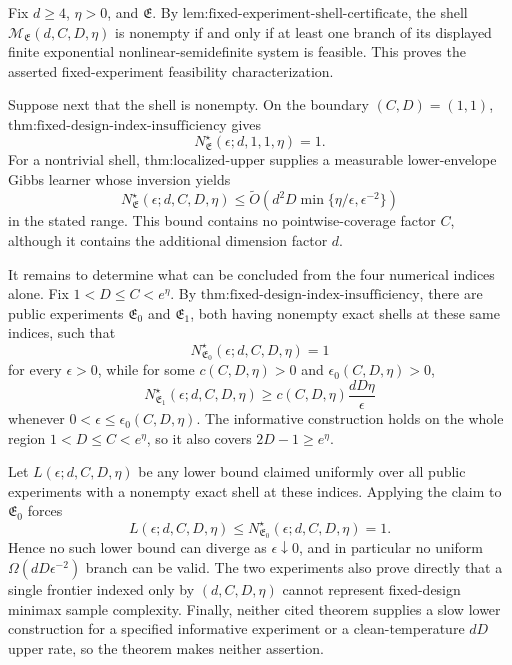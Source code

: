 Fix \(d\ge4\), \(\eta>0\), and \(\mathfrak E\). By \(\text{lem:fixed-experiment-shell-certificate}\), the shell \(\mathcal M_{\mathfrak E}(d,C,D,\eta)\) is nonempty if and only if at least one branch of its displayed finite exponential nonlinear-semidefinite system is feasible. This proves the asserted fixed-experiment feasibility characterization.

Suppose next that the shell is nonempty. On the boundary \((C,D)=(1,1)\), \(\text{thm:fixed-design-index-insufficiency}\) gives
\[
N^\star_{\mathfrak E}(\epsilon;d,1,1,\eta)=1.
\]
For a nontrivial shell, \(\text{thm:localized-upper}\) supplies a measurable lower-envelope Gibbs learner whose inversion yields
\[
N^\star_{\mathfrak E}(\epsilon;d,C,D,\eta)
\le\widetilde O\!\left(d^2D\min\{\eta/\epsilon,\epsilon^{-2}\}\right)
\]
in the stated range. This bound contains no pointwise-coverage factor \(C\), although it contains the additional dimension factor \(d\).

It remains to determine what can be concluded from the four numerical indices alone. Fix \(1<D\le C<e^\eta\). By \(\text{thm:fixed-design-index-insufficiency}\), there are public experiments \(\mathfrak E_0\) and \(\mathfrak E_1\), both having nonempty exact shells at these same indices, such that
\[
N^\star_{\mathfrak E_0}(\epsilon;d,C,D,\eta)=1
\]
for every \(\epsilon>0\), while for some \(c(C,D,\eta)>0\) and \(\epsilon_0(C,D,\eta)>0\),
\[
N^\star_{\mathfrak E_1}(\epsilon;d,C,D,\eta)
\ge c(C,D,\eta)\frac{dD\eta}{\epsilon}
\]
whenever \(0<\epsilon\le\epsilon_0(C,D,\eta)\). The informative construction holds on the whole region \(1<D\le C<e^\eta\), so it also covers \(2D-1\ge e^\eta\).

Let \(L(\epsilon;d,C,D,\eta)\) be any lower bound claimed uniformly over all public experiments with a nonempty exact shell at these indices. Applying the claim to \(\mathfrak E_0\) forces
\[
L(\epsilon;d,C,D,\eta)
\le N^\star_{\mathfrak E_0}(\epsilon;d,C,D,\eta)=1.
\]
Hence no such lower bound can diverge as \(\epsilon\downarrow0\), and in particular no uniform \(\Omega(dD\epsilon^{-2})\) branch can be valid. The two experiments also prove directly that a single frontier indexed only by \((d,C,D,\eta)\) cannot represent fixed-design minimax sample complexity. Finally, neither cited theorem supplies a slow lower construction for a specified informative experiment or a clean-temperature \(dD\) upper rate, so the theorem makes neither assertion.